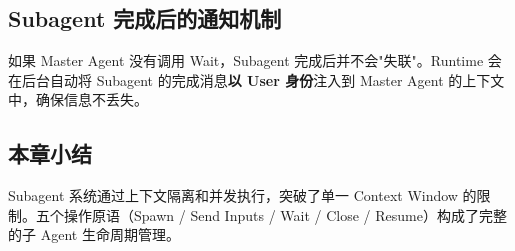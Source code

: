 \subsection{Subagent 完成后的通知机制}

如果 Master Agent 没有调用 Wait，Subagent 完成后并不会"失联"。Runtime 会在后台自动将 Subagent 的完成消息\textbf{以 User 身份}注入到 Master Agent 的上下文中，确保信息不丢失。

\subsection{本章小结}

Subagent 系统通过上下文隔离和并发执行，突破了单一 Context Window 的限制。五个操作原语（Spawn / Send Inputs / Wait / Close / Resume）构成了完整的子 Agent 生命周期管理。


